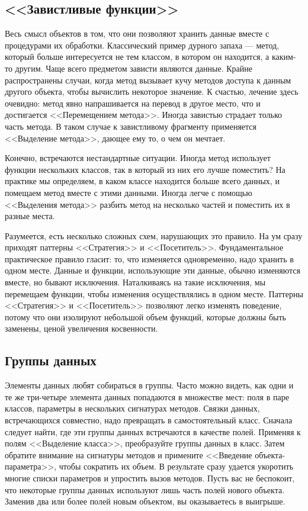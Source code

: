 \documentclass{../../text-style}
\begin{document}
\subsection{<<Завистливые функции>>}

Весь смысл объектов в том, что они позволяют хранить данные вместе с процедурами их обработки. Классический пример дурного запаха --- метод, который больше интересуется не тем классом, в котором он находится, а каким-то другим. Чаще всего предметом зависти являются данные. Крайне распространены случаи, когда метод вызывает кучу методов доступа к данным другого объекта, чтобы вычислить некоторое значение. К счастью, лечение здесь очевидно: метод явно напрашивается на перевод в другое место, что и достигается <<Перемещением метода>>. Иногда завистью страдает только часть метода. В таком случае к завистливому фрагменту применяется <<Выделение метода>>, дающее ему то, о чем он мечтает.

Конечно, встречаются нестандартные ситуации. Иногда метод использует функции нескольких классов, так в который из них его лучше поместить? На практике мы определяем, в каком классе находится больше всего данных, и помещаем метод вместе с этими данными. Иногда легче с помощью <<Выделения метода>> разбить метод на несколько частей и поместить их в разные места.

Разумеется, есть несколько сложных схем, нарушающих это правило. На ум сразу приходят паттерны <<Стратегия>> и <<Посетитель>>. Фундаментальное практическое правило гласит: то, что изменяется одновременно, надо хранить в одном месте. Данные и функции, использующие эти данные, обычно изменяются вместе, но бывают исключения. Наталкиваясь на такие исключения, мы перемещаем функции, чтобы изменения осуществлялись в одном месте. Паттерны <<Стратегия>> и <<Посетитель>> позволяют легко изменять поведение, потому что они изолируют небольшой объем функций, которые должны быть заменены, ценой увеличения косвенности.

\subsection{Группы данных}

Элементы данных любят собираться в группы. Часто можно видеть, как одни и те же три-четыре элемента данных попадаются в множестве мест: поля в паре классов, параметры в нескольких сигнатурах методов. Связки данных, встречающихся совместно, надо превращать в самостоятельный класс. Сначала следует найти, где эти группы данных встречаются в качестве полей. Применяя к полям <<Выделение класса>>, преобразуйте группы данных в класс. Затем обратите внимание на сигнатуры методов и примените <<Введение объекта-параметра>>, чтобы сократить их объем. В результате сразу удается укоротить многие списки параметров и упростить вызов методов. Пусть вас не беспокоит, что некоторые группы данных используют лишь часть полей нового объекта. Заменив два или более полей новым объектом, вы оказываетесь в выигрыше.
\end{document}
